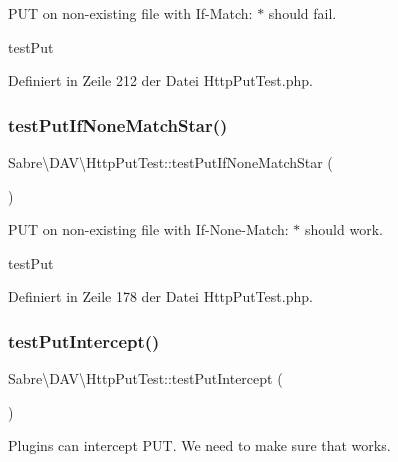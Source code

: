 P\+UT on non-\/existing file with If-\/\+Match\+: $\ast$ should fail.

test\+Put 

Definiert in Zeile 212 der Datei Http\+Put\+Test.\+php.

\mbox{\label{class_sabre_1_1_d_a_v_1_1_http_put_test_a0f8a67cb8446711cf460dde13cdde229}} 
\subsubsection{\texorpdfstring{test\+Put\+If\+None\+Match\+Star()}{testPutIfNoneMatchStar()}}
{\footnotesize\ttfamily Sabre\textbackslash{}\+D\+A\+V\textbackslash{}\+Http\+Put\+Test\+::test\+Put\+If\+None\+Match\+Star (\begin{DoxyParamCaption}{ }\end{DoxyParamCaption})}

P\+UT on non-\/existing file with If-\/\+None-\/\+Match\+: $\ast$ should work.

test\+Put 

Definiert in Zeile 178 der Datei Http\+Put\+Test.\+php.

\mbox{\label{class_sabre_1_1_d_a_v_1_1_http_put_test_a577bba82c6c7b5e3064cfcfafa57e0e2}} 
\subsubsection{\texorpdfstring{test\+Put\+Intercept()}{testPutIntercept()}}
{\footnotesize\ttfamily Sabre\textbackslash{}\+D\+A\+V\textbackslash{}\+Http\+Put\+Test\+::test\+Put\+Intercept (\begin{DoxyParamCaption}{ }\end{DoxyParamCaption})}

Plugins can intercept P\+UT. We need to make sure that works.

